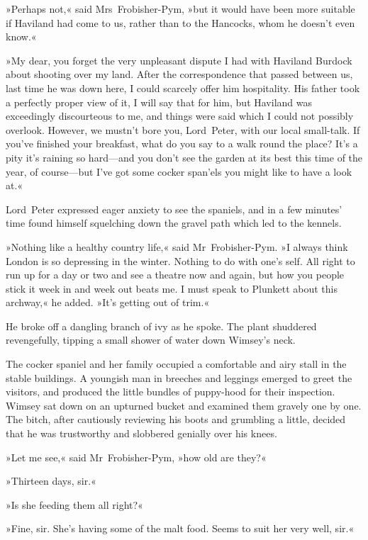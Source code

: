 »Perhaps not,« said Mrs~Frobisher-Pym, »but it would have been more suitable if Haviland had come to us, rather than to the Hancocks, whom he doesn't even know.«

»My dear, you forget the very unpleasant dispute I had with Haviland Burdock about shooting over my land. After the correspondence that passed between us, last time he was down here, I could scarcely offer him hospitality. His father took a perfectly proper view of it, I will say that for him, but Haviland was exceedingly discourteous to me, and things were said which I could not possibly overlook. However, we mustn't bore you, Lord~Peter, with our local small-talk. If you've finished your breakfast, what do you say to a walk round the place? It's a pity it's raining so hard—and you don't see the garden at its best this time of the year, of course—but I've got some cocker span'els you might like to have a look at.«

Lord~Peter expressed eager anxiety to see the spaniels, and in a few minutes' time found himself squelching down the gravel path which led to the kennels.

»Nothing like a healthy country life,« said Mr~Frobisher-Pym. »I always think London is so depressing in the winter. Nothing to do with one's self. All right to run up for a day or two and see a theatre now and again, but how you people stick it week in and week out beats me. I must speak to Plunkett about this archway,« he added. »It's getting out of trim.«

He broke off a dangling branch of ivy as he spoke. The plant shuddered revengefully, tipping a small shower of water down Wimsey's neck.

The cocker spaniel and her family occupied a comfortable and airy stall in the stable buildings. A youngish man in breeches and leggings emerged to greet the visitors, and produced the little bundles of puppy-hood for their inspection. Wimsey sat down on an upturned bucket and examined them gravely one by one. The bitch, after cautiously reviewing his boots and grumbling a little, decided that he was trustworthy and slobbered genially over his knees.

»Let me see,« said Mr~Frobisher-Pym, »how old are they?«

»Thirteen days, sir.«

»Is she feeding them all right?«

»Fine, sir. She's having some of the malt food. Seems to suit her very well, sir.«

